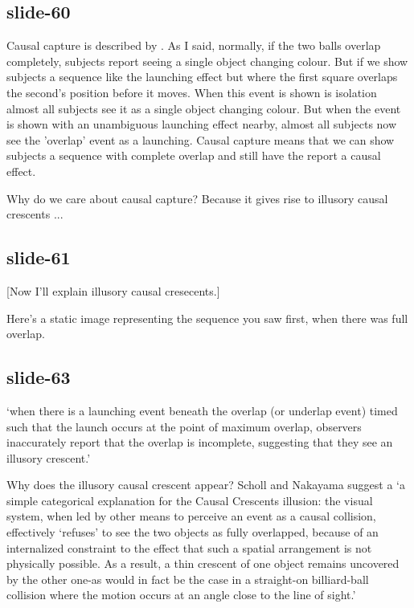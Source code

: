 \documentclass[12pt,\papersize]{extarticle}
\begin{document}
\subsection{slide-60}
Causal capture is described by \citep{Scholl:2002eb}.
As I said,
normally, if the two balls overlap completely, subjects report seeing a single object 
changing colour.
But if we show subjects a sequence like the launching effect but where the first square 
overlaps the second's position before it moves.  When this event is shown is isolation 
almost all subjects see it as a single object changing colour.  But when the event is 
shown with an 
unambiguous launching effect nearby, almost all subjects now see the 'overlap' event as 
a launching.
Causal capture means that we can show subjects a sequence with complete overlap and 
still have the report a causal effect.
 
Why do we care about causal capture?  Because it gives rise to illusory causal 
crescents ...
 
\subsection{slide-61}
[Now I'll explain illusory causal cresecents.]
 
Here's a static image representing the sequence you saw first, when there was full overlap.
 
\subsection{slide-63}
‘when there is a launching event beneath the overlap (or underlap event) timed such that 
the launch occurs at the point of maximum overlap, observers inaccurately report that 
the overlap is incomplete, suggesting that they see an illusory crescent.’ 
\citep[p.\ 461]{Scholl:2004dx}
 
Why does the illusory causal crescent appear?  Scholl and Nakayama suggest a  
‘a simple categorical explanation for the Causal Crescents illusion: the visual system, 
when led by other means to perceive an event as a causal collision, effectively 
‘refuses’ to see the two objects as fully overlapped, because of an internalized 
constraint to the effect that such a spatial arrangement is not physically possible. 
As a result, a thin crescent of one object remains uncovered by the other one-as 
would in fact be the case in a straight-on billiard-ball collision where the motion 
occurs at an angle close to the line of sight.’ 
\citep[p.\ 466]{Scholl:2004dx}
 
\end{document}
